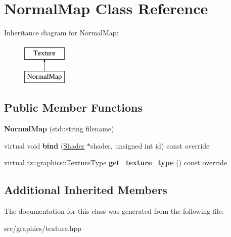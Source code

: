\hypertarget{class_normal_map}{}\section{Normal\+Map Class Reference}
\label{class_normal_map}
Inheritance diagram for Normal\+Map\+:\begin{figure}[H]
\begin{center}
\leavevmode
\includegraphics[height=2.000000cm]{class_normal_map}
\end{center}
\end{figure}
\subsection*{Public Member Functions}
\begin{DoxyCompactItemize}
\item 
\mbox{\label{class_normal_map_ac654e582d00760ff4043bd9fde77881c}} 
{\bfseries Normal\+Map} (std\+::string filename)
\item 
\mbox{\label{class_normal_map_a9d23a2f3fc54373bc0e3e56940ead720}} 
virtual void {\bfseries bind} (\mbox{\hyperlink{class_shader}{Shader}} $\ast$shader, unsigned int id) const override
\item 
\mbox{\label{class_normal_map_a60bab20997073a76d916b67d520f89a9}} 
virtual tz\+::graphics\+::\+Texture\+Type {\bfseries get\+\_\+texture\+\_\+type} () const override
\end{DoxyCompactItemize}
\subsection*{Additional Inherited Members}


The documentation for this class was generated from the following file\+:\begin{DoxyCompactItemize}
\item 
src/graphics/texture.\+hpp\end{DoxyCompactItemize}

